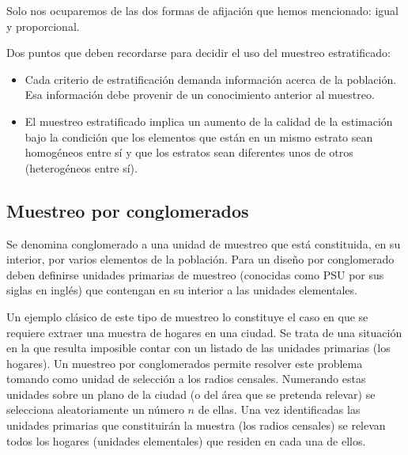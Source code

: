 \documentclass[]{book}
\begin{document}
Solo nos ocuparemos de las dos formas de afijación que hemos mencionado: igual y proporcional.

Dos puntos que deben recordarse para decidir el uso del muestreo
estratificado:

\begin{itemize}
\item
  Cada criterio de estratificación demanda información acerca de la
  población. Esa información debe provenir de un conocimiento anterior al
  muestreo.
\item
  El muestreo estratificado implica un aumento de la calidad de la
  estimación bajo la condición que los elementos que están en un mismo
  estrato sean homogéneos entre sí y que los estratos sean diferentes unos de otros (heterogéneos entre sí).
\end{itemize}

\hypertarget{muestreo-por-conglomerados}{%
\subsection{Muestreo por conglomerados}\label{muestreo-por-conglomerados}}

Se denomina conglomerado a una unidad de muestreo que está constituida,
en su interior, por varios elementos de la población. Para un diseño por
conglomerado deben definirse unidades primarias de muestreo (conocidas como PSU por sus siglas en inglés) que contengan en su interior a las unidades elementales.

Un ejemplo clásico de este tipo de muestreo lo constituye el caso en que
se requiere extraer una muestra de hogares en una ciudad. Se trata de
una situación en la que resulta imposible contar con un listado de las
unidades primarias (los hogares). Un muestreo por conglomerados permite
resolver este problema tomando como unidad de selección a los radios censales. Numerando estas unidades sobre un plano de la ciudad (o del
área que se pretenda relevar) se selecciona aleatoriamente un número \(n\) de ellas. Una vez identificadas las unidades primarias que constituirán
la muestra (los radios censales) se relevan todos los hogares (unidades elementales) que residen en cada una de ellos.
\end{document}
